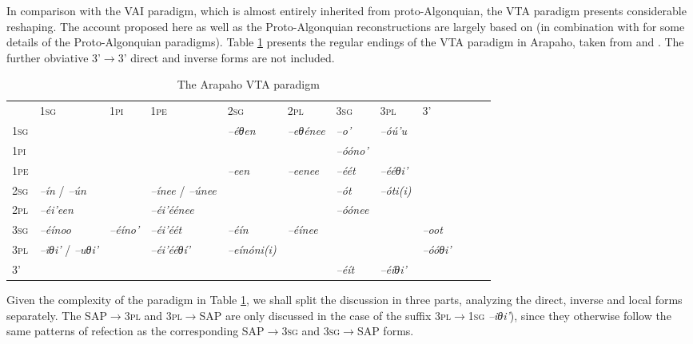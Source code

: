 \documentclass[twoside,a4paper,11pt]{article}
\newcommand{\ipa}[1]{{\phon\textit{#1}}}
\newcommand{\sg}{\textsc{sg}}
\newcommand{\pl}{\textsc{pl}}
\newcommand{\grise}[1]{\cellcolor{lightgray}\textbf{#1}}
\newcommand{\Σ}{\greek{Σ}}
\newcommand{\pli}{\textsc{pi}}
\newcommand{\pe}{\textsc{pe}}
\begin{document}
In comparison with the VAI paradigm, which is almost entirely inherited from proto-Algonquian, the VTA paradigm presents considerable reshaping. The account proposed here as well as the Proto-Algonquian reconstructions are largely based on  \citet[19-24]{goddard65arapaho} (in combination with  \citealt{goddard00cheyenne} for some details of the Proto-Algonquian paradigms). Table \ref{tab:arapaho.vta}   presents the regular endings of the VTA paradigm in Arapaho, taken from  \citet[487-490]{cowell06arapaho} and \citet[448]{cowell05hinono}. The  further obviative 3'$\rightarrow$3' direct and inverse forms are not included.

\begin{table}[H]
\caption{The Arapaho VTA paradigm}
\centering \label{tab:arapaho.vta}
\begin{tabular}{llllllllllll}
\toprule
 & 	1\sg{}& 	1\pli{} & 	1\pe{} & 	2\sg{}& 	2\pl{}& 	3\sg{} & 	3\pl{} & 	3' & 	\\
1\sg{}& \grise{} & 	\grise{} & 	\grise{} & 	\ipa{--éθen} & 	\ipa{--eθénee} & 	\ipa{--o'} &\ipa{--óú'u}  	 & 	 & 	\\
1\pli{} & 	\grise{} & 	\grise{} & 	\grise{} & 	\grise{} & 	\grise{} & 	\ipa{--óóno'} & 	 & 	 & 	\\
1\pe{} & 	\grise{} & 	\grise{} & 	\grise{} & 	\ipa{--een} & 	\ipa{--eenee} & 	\ipa{--éét} & 	\ipa{--ééθi'}  & 	 & 	\\
2\sg{}& 	\ipa{--ín} / \ipa{--ún}& 	\grise{} & \ipa{--ínee} /	\ipa{--únee} & 	\grise{} & 	\grise{} & 	\ipa{--ót} & 	 \ipa{--óti(i)}& 	 & 	\\
2\pl{}& 	\ipa{--éi'een} & 	\grise{} & 	\ipa{--éi'éénee} & 	\grise{} & 	\grise{} & 	\ipa{--óónee} & 	 & 	 & 	\\
3\sg{} & 	\ipa{--éínoo} & 	\ipa{--éíno'} & 	\ipa{--éi'éét} & 	\ipa{--éín} & 	\ipa{--éínee} & 	\grise{} & 	\grise{} & 	\ipa{--oot} & 	\\
3\pl{}& \ipa{--iθi'} /	\ipa{--uθi'} & 	 & 	\ipa{--éi'ééθí'}  & 	\ipa{--eínóni(i)}  & 	 & 	\grise{} & 	\grise{} & 	\ipa{--óóθi'} & 	\\
3' & 	 & 	 & 	 & 	 & 	 & 	\ipa{--éít} & 	\ipa{--éíθi'} &   & 	\\
\bottomrule
\end{tabular}
\end{table}

Given the complexity of the paradigm in Table \ref{tab:arapaho.vta}, we shall split the discussion  in three parts, analyzing the direct, inverse and local forms separately. The SAP$\rightarrow$3\pl{} and 3\pl{}$\rightarrow$SAP are only discussed in the case of the suffix 3\pl{}$\rightarrow$1\sg{} \ipa{--iθi'}), since they otherwise follow the same patterns of refection as the  corresponding SAP$\rightarrow$3\sg{} and 3\sg{}$\rightarrow$SAP forms.
\end{document}
